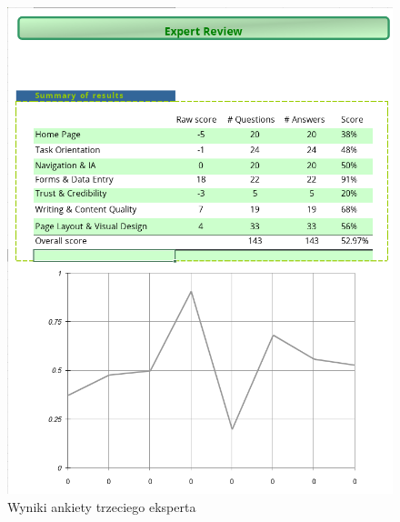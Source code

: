 \documentclass[inzynier,druk]{dyplom}
\begin{document}
\begin{figure}
	\centering\includegraphics[width=\textwidth]{img/ankieta3}
	\caption{Wyniki ankiety trzeciego eksperta}\label{rys:ankieta3}%
\end{figure}
\end{document}
